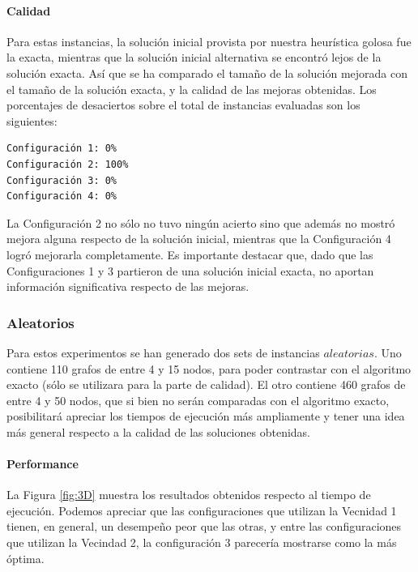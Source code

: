 \paragraph{Calidad} Para estas instancias, la solución inicial provista por nuestra heurística golosa fue la exacta, mientras que la solución inicial alternativa se encontró lejos de la solución exacta. Así que se ha comparado el tamaño de la solución mejorada con el tamaño de la solución exacta, y la calidad de las mejoras obtenidas.  Los porcentajes de desaciertos sobre el total de instancias evaluadas son los siguientes:

\begin{verbatim}
Configuración 1: 0%
Configuración 2: 100%
Configuración 3: 0%
Configuración 4: 0%
\end{verbatim}

La Configuración 2 no sólo no tuvo ningún acierto sino que además no mostró mejora alguna respecto de la solución inicial, mientras que la Configuración 4 logró mejorarla completamente.  Es importante destacar que, dado que las Configuraciones 1 y 3 partieron de una solución inicial exacta, no aportan información significativa respecto de las mejoras.

\subsubsection{Aleatorios}

Para estos experimentos se han generado dos sets de instancias $aleatorias$. Uno contiene 110 grafos de entre 4 y 15 nodos, para poder contrastar con el algoritmo exacto (sólo se utilizara para la parte de calidad). El otro contiene 460 grafos de entre 4 y 50 nodos, que si bien no serán comparadas con el algoritmo exacto, posibilitará apreciar los tiempos de ejecución más ampliamente y tener una idea más general respecto a la calidad de las soluciones obtenidas.

\paragraph{Performance} La Figura \ref{fig:3D} muestra los resultados obtenidos respecto al tiempo de ejecución. Podemos apreciar que las configuraciones que utilizan la Vecnidad 1 tienen, en general, un desempeño peor que las otras, y entre las configuraciones que utilizan la Vecindad 2, la configuración 3 parecería mostrarse como la más óptima.

